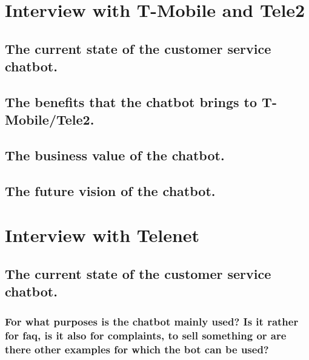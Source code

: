 \begin{appendices}
	\section{Interview with T-Mobile and Tele2}
	\label{in:T-Mobile}
	\subsection{The current state of the customer service chatbot.}
	\subsection{The benefits that the chatbot brings to T-Mobile/Tele2.}
	\subsection{The business value of the chatbot.}
	\subsection{The future vision of the chatbot.}
	
	\section{Interview with Telenet}
	\label{in:Telenet}
	\subsection{The current state of the customer service chatbot.}
	\subsubsection{For what purposes is the chatbot mainly used? Is it rather for \acrshort{faq}, is it also for complaints, to sell something or are there other examples for which the bot can be used?}
	

\end{appendices}
